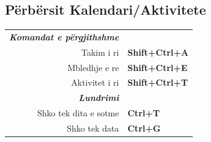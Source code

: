 \documentclass[12pt]{article}
\begin{document}
\begin{landscape}
\begin{center}
\begin{multicols}{2}
	\section*{Përbërsit Kalendari/Aktivitete}
	\begin{tabular*}{4in}{rp{1.5in}}
		\textit{\textbf{Komandat e përgjithshme}}	&					\\
		Takim i ri				& \textbf{Shift+Ctrl+A}			\\
		Mbledhje e re				& \textbf{Shift+Ctrl+E}			\\
		\vspace{1.5mm}
		Aktivitet i ri				& \textbf{Shift+Ctrl+T}			\\
		\textit{\textbf{Lundrimi}}		&					\\
		Shko tek dita e sotme				& \textbf{Ctrl+T}			\\
		Shko tek data				& \textbf{Ctrl+G}			\\
	\end{tabular*}
	\end{multicols}
	\end{center}
	\end{landscape}
 
\end{document}
